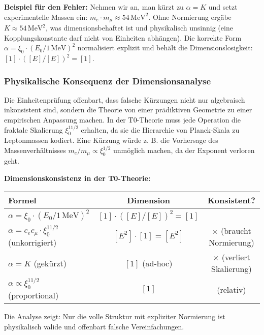 \documentclass[12pt,a4paper]{article}
\newcommand{\xipar}{\xi_0}
\begin{document}
	\textbf{Beispiel für den Fehler:} Nehmen wir an, man kürzt zu $\alpha = K$ und setzt experimentelle Massen ein: $m_e \cdot m_\mu \approx 54\,\text{MeV}^2$. Ohne Normierung ergäbe $K \approx 54\,\text{MeV}^2$, was dimensionsbehaftet ist und physikalisch unsinnig (eine Kopplungskonstante darf nicht von Einheiten abhängen). Die korrekte Form $\alpha = \xipar \cdot (E_0 / 1\,\text{MeV})^2$ normalisiert explizit und behält die Dimensionslosigkeit: $[1] \cdot ([E]/[E])^2 = [1]$.
	
	\subsubsection{Physikalische Konsequenz der Dimensionsanalyse}
	
	Die Einheitenprüfung offenbart, dass falsche Kürzungen nicht nur algebraisch inkonsistent sind, sondern die Theorie von einer prädiktiven Geometrie zu einer empirischen Anpassung machen. In der T0-Theorie muss jede Operation die fraktale Skalierung $\xipar^{11/2}$ erhalten, da sie die Hierarchie von Planck-Skala zu Leptonmassen kodiert. Eine Kürzung würde z. B. die Vorhersage des Massenverhältnisses $m_e/m_\mu \propto \xipar^{1/2}$ unmöglich machen, da der Exponent verloren geht.
	
	\begin{foundation}
		\textbf{Dimensionskonsistenz in der T0-Theorie:}
		\begin{center}
			\begin{tabular}{lcc}
				\toprule
				\textbf{Formel} & \textbf{Dimension} & \textbf{Konsistent?} \\
				\midrule
				$\alpha = \xipar \cdot (E_0 / 1\,\text{MeV})^2$ & $[1] \cdot ([E]/[E])^2 = [1]$ & \checkmark \\
				$\alpha = c_e c_\mu \cdot \xipar^{11/2}$ (unkorrigiert) & $[E^2] \cdot [1] = [E^2]$ & $\times$ (braucht Normierung) \\
				$\alpha = K$ (gekürzt) & $[1]$ (ad-hoc) & $\times$ (verliert Skalierung) \\
				$\alpha \propto \xipar^{11/2}$ (proportional) & $[1]$ & \checkmark (relativ) \\
				\bottomrule
			\end{tabular}
		\end{center}
		
		Die Analyse zeigt: Nur die volle Struktur mit expliziter Normierung ist physikalisch valide und offenbart falsche Vereinfachungen.
	\end{foundation}
	
\end{document}
